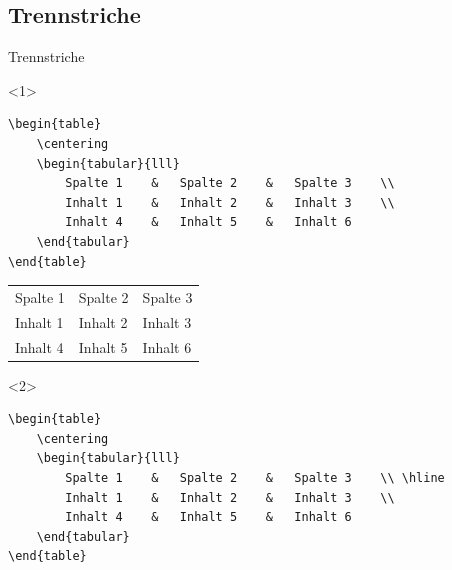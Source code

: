 \subsection{Trennstriche}
\begin{frame}[c]
	\begin{center}
		\large Trennstriche
	\end{center}
\end{frame}
\begin{frame}[fragile]
	\begin{onlyenv}
		\Code
		\begin{lstlisting}
\begin{table}
	\centering
	\begin{tabular}{lll}
		Spalte 1	&	Spalte 2	&	Spalte 3	\\
		Inhalt 1	&	Inhalt 2	&	Inhalt 3	\\
		Inhalt 4	&	Inhalt 5	&	Inhalt 6	
	\end{tabular}
\end{table}
		\end{lstlisting}
		\Ausgabe
		\begin{outputbox}
			\begin{table}
				\centering
				\begin{tabular}{lll}
					Spalte 1	&	Spalte 2	&	Spalte 3	\\
					Inhalt 1	&	Inhalt 2	&	Inhalt 3	\\
					Inhalt 4	&	Inhalt 5	&	Inhalt 6	
				\end{tabular}
			\end{table}
		\end{outputbox}
	\end{onlyenv}
	\begin{onlyenv}
		\Code
		\begin{lstlisting}
\begin{table}
	\centering
	\begin{tabular}{lll}
		Spalte 1	&	Spalte 2	&	Spalte 3	\\ \hline
		Inhalt 1	&	Inhalt 2	&	Inhalt 3	\\
		Inhalt 4	&	Inhalt 5	&	Inhalt 6	
	\end{tabular}
\end{table}
		\end{lstlisting}

\end{onlyenv}
\end{frame}
